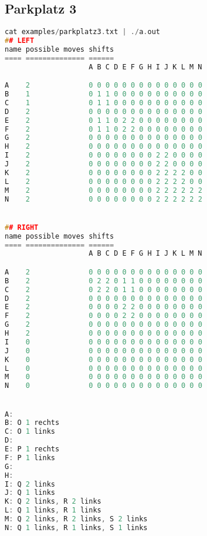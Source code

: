 \documentclass[a4paper,10pt,ngerman]{scrartcl}
\begin{document}
\subsection*{Parkplatz 3}
\begin{lstlisting}[language=C++]
cat examples/parkplatz3.txt | ./a.out
## LEFT
name possible moves shifts
==== ============== ======
                    A B C D E F G H I J K L M N

A    2              0 0 0 0 0 0 0 0 0 0 0 0 0 0
B    1              0 1 1 0 0 0 0 0 0 0 0 0 0 0
C    1              0 1 1 0 0 0 0 0 0 0 0 0 0 0
D    2              0 0 0 0 0 0 0 0 0 0 0 0 0 0
E    2              0 1 1 0 2 2 0 0 0 0 0 0 0 0
F    2              0 1 1 0 2 2 0 0 0 0 0 0 0 0
G    2              0 0 0 0 0 0 0 0 0 0 0 0 0 0
H    2              0 0 0 0 0 0 0 0 0 0 0 0 0 0
I    2              0 0 0 0 0 0 0 0 2 2 0 0 0 0
J    2              0 0 0 0 0 0 0 0 2 2 0 0 0 0
K    2              0 0 0 0 0 0 0 0 2 2 2 2 0 0
L    2              0 0 0 0 0 0 0 0 2 2 2 2 0 0
M    2              0 0 0 0 0 0 0 0 2 2 2 2 2 2
N    2              0 0 0 0 0 0 0 0 2 2 2 2 2 2


## RIGHT
name possible moves shifts
==== ============== ======
                    A B C D E F G H I J K L M N

A    2              0 0 0 0 0 0 0 0 0 0 0 0 0 0
B    2              0 2 2 0 1 1 0 0 0 0 0 0 0 0
C    2              0 2 2 0 1 1 0 0 0 0 0 0 0 0
D    2              0 0 0 0 0 0 0 0 0 0 0 0 0 0
E    2              0 0 0 0 2 2 0 0 0 0 0 0 0 0
F    2              0 0 0 0 2 2 0 0 0 0 0 0 0 0
G    2              0 0 0 0 0 0 0 0 0 0 0 0 0 0
H    2              0 0 0 0 0 0 0 0 0 0 0 0 0 0
I    0              0 0 0 0 0 0 0 0 0 0 0 0 0 0
J    0              0 0 0 0 0 0 0 0 0 0 0 0 0 0
K    0              0 0 0 0 0 0 0 0 0 0 0 0 0 0
L    0              0 0 0 0 0 0 0 0 0 0 0 0 0 0
M    0              0 0 0 0 0 0 0 0 0 0 0 0 0 0
N    0              0 0 0 0 0 0 0 0 0 0 0 0 0 0


A:
B: O 1 rechts
C: O 1 links
D:
E: P 1 rechts
F: P 1 links
G:
H:
I: Q 2 links
J: Q 1 links
K: Q 2 links, R 2 links
L: Q 1 links, R 1 links
M: Q 2 links, R 2 links, S 2 links
N: Q 1 links, R 1 links, S 1 links
\end{lstlisting}
\end{document}
